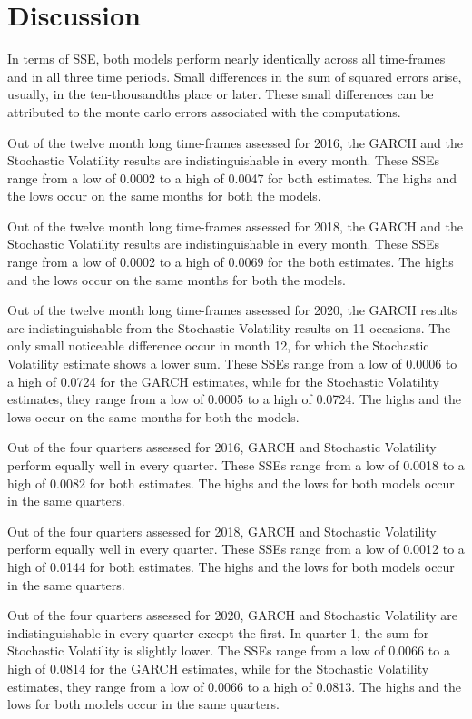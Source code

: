 \documentclass[12pt,letterpaper,reqno,fleqn]{article}
\begin{document}
\newpage
\section{Discussion}
In terms of SSE, both models perform nearly identically across all time-frames and in all three time periods. Small differences in the sum of squared errors arise, usually, in the ten-thousandths place or later. These small differences can be attributed to the monte carlo errors associated with the computations. 

Out of the twelve month long time-frames assessed for 2016, the GARCH and the Stochastic Volatility results are indistinguishable in every month. These SSEs range from a low of 0.0002 to a high of 0.0047 for both estimates. The highs and the lows occur on the same months for both the models.

Out of the twelve month long time-frames assessed for 2018, the GARCH and the Stochastic Volatility results are indistinguishable in every month. These SSEs range from a low of 0.0002 to a high of 0.0069 for the both estimates. The highs and the lows occur on the same months for both the models.

Out of the twelve month long time-frames assessed for 2020, the GARCH results are indistinguishable from the Stochastic Volatility results on 11 occasions. The only small noticeable difference occur in month 12, for which the Stochastic Volatility estimate shows a lower sum. These SSEs range from a low of 0.0006 to a high of 0.0724 for the GARCH estimates, while for the Stochastic Volatility estimates, they range from a low of 0.0005 to a high of 0.0724. The highs and the lows occur on the same months for both the models.

Out of the four quarters assessed for 2016, GARCH and Stochastic Volatility perform equally well in every quarter. These SSEs range from a low of 0.0018 to a high of 0.0082 for both estimates. The highs and the lows for both models occur in the same quarters.  

Out of the four quarters assessed for 2018, GARCH and Stochastic Volatility perform equally well in every quarter. These SSEs range from a low of 0.0012 to a high of 0.0144 for both estimates. The highs and the lows for both models occur in the same quarters.

Out of the four quarters assessed for 2020, GARCH and Stochastic Volatility are indistinguishable in every quarter except the first. In quarter 1, the sum for Stochastic Volatility is slightly lower. The SSEs range from a low of 0.0066 to a high of 0.0814 for the GARCH estimates, while for the Stochastic Volatility estimates, they range from a low of 0.0066 to a high of 0.0813. The highs and the lows for both models occur in the same quarters.  
\end{document}
